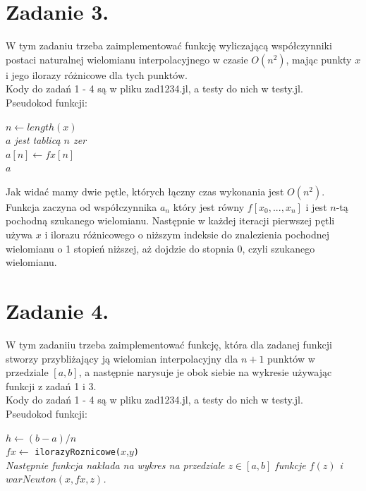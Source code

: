 \documentclass{article}
\begin{document}
\section{Zadanie 3.}
W tym zadaniu trzeba zaimplementować funkcję wyliczającą współczynniki postaci naturalnej wielomianu interpolacyjnego w czasie $O(n^2)$, mając punkty $x$ i jego ilorazy różnicowe dla tych punktów.\\
Kody do zadań 1 - 4 są w pliku zad1234.jl, a testy do nich w testy.jl.\\
Pseudokod funkcji:\\
\begin{algorithm}[H]
$n \leftarrow length(x)$\\
\emph{$a$ jest tablicą $n$ zer}\\
$a[n] \leftarrow fx[n]$\\
\KwRet $a$
\end{algorithm}
Jak widać mamy dwie pętle, których łączny czas wykonania jest $O(n^2)$. Funkcja zaczyna od współczynnika $a_n$ który jest równy $f[x_0,...,x_n]$ i jest $n$-tą pochodną szukanego wielomianu. Następnie w każdej iteracji pierwszej pętli używa $x$ i ilorazu różnicowego o niższym indeksie do znalezienia pochodnej wielomianu o 1 stopień niższej, aż dojdzie do stopnia 0, czyli szukanego wielomianu.
\section{Zadanie 4.}
W tym zadaniiu trzeba zaimplementować funkcję, która dla zadanej funkcji stworzy przybliżający ją wielomian interpolacyjny dla $n+1$ punktów w przedziale $[a,b]$, a następnie narysuje je obok siebie na wykresie używając funkcji z zadań 1 i 3.\\
Kody do zadań 1 - 4 są w pliku zad1234.jl, a testy do nich w testy.jl.\\
Pseudokod funkcji:\\
\begin{algorithm}[H]
$h \leftarrow (b-a)/n$\\
$fx \leftarrow$ \verb|ilorazyRoznicowe(|$x$,$y$\verb|)|\\
\emph{Następnie funkcja nakłada na wykres na przedziale $z\in[a,b]$ funkcje $f(z)$ i $warNewton(x,fx,z)$.}
\end{algorithm}
\end{document}
